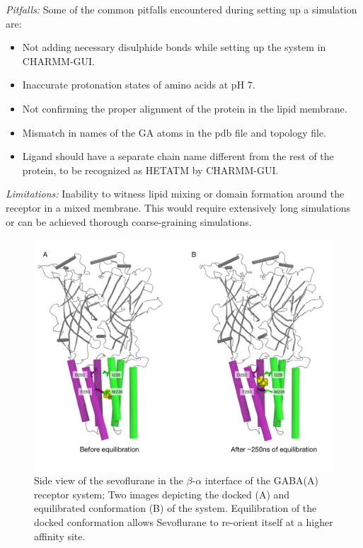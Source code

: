 \documentclass[12pt]{article}
\begin{document}
\textit{Pitfalls:} 
Some of the common pitfalls encountered during setting up a simulation are:
		\begin{itemize}
			\item Not adding necessary disulphide bonds while setting up the system in CHARMM-GUI.
			\item Inaccurate protonation states of amino acids at pH 7.
			\item Not confirming the proper alignment of the protein in the lipid membrane.
			\item Mismatch in names of the GA atoms in the pdb file and topology file.
			\item Ligand should have a separate chain name different from the rest of the protein, to be recognized as HETATM by CHARMM-GUI.
		\end{itemize}		
	 
\textit{Limitations:} Inability to witness lipid mixing or domain formation around the receptor in a mixed membrane. This would require extensively long simulations or can be achieved thorough coarse-graining simulations.

  
\begin{figure}
\begin{center}
\centering
\includegraphics[width = 1\textwidth]{finlpics/sevo_MD_comp}
\caption{Side view of the sevoflurane in the $\beta$-$\alpha$ interface of the GABA(A) receptor system; Two images depicting the docked (A) and equilibrated conformation (B) of the system. Equilibration of the docked conformation allows Sevoflurane to re-orient itself at a higher affinity site.}
\label{fig:sevMD}
\end{center}
\end{figure}
\end{document}
